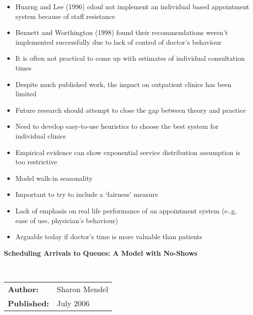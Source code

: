 \documentclass{article}
\begin{document}
\begin{itemize}
    \item Huarng and Lee (1996) cdoul not implement an individual based appointment system because of staff resistance
    \item Bennett and Worthington (1998) found their recommendations weren't implemented successfully due to lack of control of doctor's behaviour
    \item It is often not practical to come up with estimates of individual consultation times
    \item Despite much published work, the impact on outpatient clinics has been limited
    \item Future research should attempt to close the gap between theory and practice
    \item Need to develop easy-to-use heuristics to choose the best system for individual clinics
    \item Empirical evidence can show exponential service distribution assumption is too restrictive
    \item Model walk-in seasonality
    \item Important to try to include a `fairness' measure
    \item Lack of emphasis on real life performance of an appointment system (e..g, ease of use, physician's behaviour)
    \item Arguable today if doctor's time is more valuable than patients
\end{itemize}

\textbf{Scheduling Arrivals to Queues: A Model with No-Shows}

\ \newline

\begin{tabular}{l l}
    \textbf{Author:} & Sharon Mendel \\
    \textbf{Published:} & July 2006 \\
\end{tabular}
\end{document}
